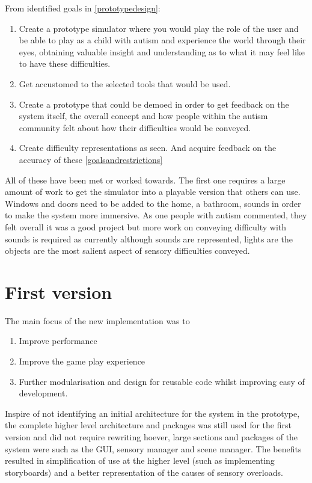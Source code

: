 \documentclass[11pt]{report}
\begin{document}
From identified goals in \ref{prototypedesign}:
\begin{enumerate}
\item Create a prototype simulator where you would play the role of the user and be able to play as a child with autism and experience the world through their eyes, obtaining valuable insight and understanding as to what it may feel like to have these difficulties.
\item Get accustomed to the selected tools that would be used.
\item Create a prototype that could be demoed in order to get feedback on the system itself, the overall concept and how people within the autism community felt about how their difficulties would be conveyed.
\item Create difficulty representations as seen. And acquire feedback on the accuracy of these \ref{goalsandrestrictions}
\end{enumerate}

All of these have been met or worked towards. The first one requires a large amount of work to get the simulator into a playable version that others can use. Windows and doors need to be added to the home, a bathroom, sounds in order to make the system more immersive. As one people with autism commented, they felt overall it was a good project but more work on conveying difficulty with sounds is required as currently although sounds are represented, lights are the objects are the most salient aspect of sensory difficulties conveyed. 

\chapter{First version}
The main focus of the new implementation was to 

\begin{enumerate}
\item Improve performance
\item Improve the game play experience
\item Further modularisation and design for reusable code whilst improving easy of development. 
\end{enumerate}

Inspire of not identifying an initial architecture for the system in the prototype, the complete higher level architecture and packages was still used for the first version and did not require rewriting hoever, large sections and packages of the system were such as the GUI, sensory manager and scene manager. The benefits resulted in simplification of use at the higher level (such as implementing storyboards) and a better representation of the causes of sensory overloads.
\end{document}
